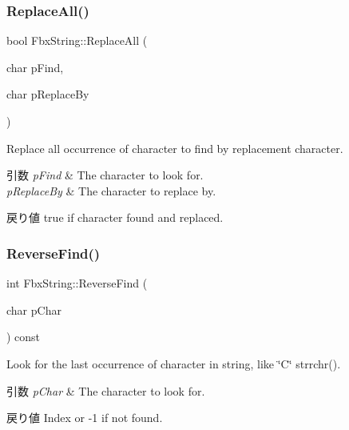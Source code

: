 \subsubsection{\texorpdfstring{Replace\+All()}{ReplaceAll()}\hspace{0.1cm}{\footnotesize\ttfamily [2/2]}}
{\footnotesize\ttfamily bool Fbx\+String\+::\+Replace\+All (\begin{DoxyParamCaption}\item[{char}]{p\+Find,  }\item[{char}]{p\+Replace\+By }\end{DoxyParamCaption})}

Replace all occurrence of character to find by replacement character. 
\begin{DoxyParams}{引数}
{\em p\+Find} & The character to look for. \\
\hline
{\em p\+Replace\+By} & The character to replace by. \\
\hline
\end{DoxyParams}
\begin{DoxyReturn}{戻り値}
{\ttfamily true} if character found and replaced. 
\end{DoxyReturn}
\mbox{\label{class_fbx_string_ace5a9c1f1e86a44c5ee70ff7fa70a4a2}} 
\subsubsection{\texorpdfstring{Reverse\+Find()}{ReverseFind()}}
{\footnotesize\ttfamily int Fbx\+String\+::\+Reverse\+Find (\begin{DoxyParamCaption}\item[{char}]{p\+Char }\end{DoxyParamCaption}) const}

Look for the last occurrence of character in string, like \char`\"{}\+C\char`\"{} strrchr(). 
\begin{DoxyParams}{引数}
{\em p\+Char} & The character to look for. \\
\hline
\end{DoxyParams}
\begin{DoxyReturn}{戻り値}
Index or -\/1 if not found. 
\end{DoxyReturn}
\mbox{\label{class_fbx_string_a48148b426b07c11495d981e026b25857}} 
